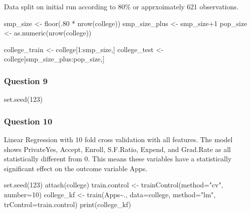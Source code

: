 \documentclass[]{article}
\newenvironment{Shaded}{\begin{snugshade}}{\end{snugshade}}
\newcommand{\AttributeTok}[1]{\textcolor[rgb]{0.77,0.63,0.00}{#1}}
\newcommand{\DecValTok}[1]{\textcolor[rgb]{0.00,0.00,0.81}{#1}}
\newcommand{\FunctionTok}[1]{\textcolor[rgb]{0.00,0.00,0.00}{#1}}
\newcommand{\NormalTok}[1]{#1}
\newcommand{\OtherTok}[1]{\textcolor[rgb]{0.56,0.35,0.01}{#1}}
\newcommand{\SpecialCharTok}[1]{\textcolor[rgb]{0.00,0.00,0.00}{#1}}
\newcommand{\StringTok}[1]{\textcolor[rgb]{0.31,0.60,0.02}{#1}}
\begin{document}
Data split on initial run according to 80\% or apprxoimately 621
observations.

\begin{Shaded}
\begin{Highlighting}[]
\NormalTok{smp\_size }\OtherTok{\textless{}{-}} \FunctionTok{floor}\NormalTok{(.}\DecValTok{80} \SpecialCharTok{*} \FunctionTok{nrow}\NormalTok{(college))}
\NormalTok{smp\_size\_plus }\OtherTok{\textless{}{-}}\NormalTok{ smp\_size}\SpecialCharTok{+}\DecValTok{1}
\NormalTok{pop\_size }\OtherTok{\textless{}{-}} \FunctionTok{as.numeric}\NormalTok{(}\FunctionTok{nrow}\NormalTok{(college))}

\NormalTok{college\_train }\OtherTok{\textless{}{-}}\NormalTok{ college[}\DecValTok{1}\SpecialCharTok{:}\NormalTok{smp\_size,]}
\NormalTok{college\_test }\OtherTok{\textless{}{-}}\NormalTok{ college[smp\_size\_plus}\SpecialCharTok{:}\NormalTok{pop\_size,]}
\end{Highlighting}
\end{Shaded}

\hypertarget{question-9}{%
\subsubsection{Question 9}\label{question-9}}

\begin{Shaded}
\begin{Highlighting}[]
\FunctionTok{set.seed}\NormalTok{(}\DecValTok{123}\NormalTok{)}
\end{Highlighting}
\end{Shaded}

\hypertarget{question-10}{%
\subsubsection{Question 10}\label{question-10}}

Linear Regression with 10 fold cross validation with all features. The
model shows PrivateYes, Accept, Enroll, S.F.Ratio, Expend, and Grad.Rate
as all statistically different from 0. This means these variables have a
statistically significant effect on the outcome variable Apps.

\begin{Shaded}
\begin{Highlighting}[]
\FunctionTok{set.seed}\NormalTok{(}\DecValTok{123}\NormalTok{)}
\FunctionTok{attach}\NormalTok{(college)}
\NormalTok{train.control }\OtherTok{\textless{}{-}} \FunctionTok{trainControl}\NormalTok{(}\AttributeTok{method=}\StringTok{"cv"}\NormalTok{, }\AttributeTok{number=}\DecValTok{10}\NormalTok{)}
\NormalTok{college\_kf }\OtherTok{\textless{}{-}} \FunctionTok{train}\NormalTok{(Apps}\SpecialCharTok{\textasciitilde{}}\NormalTok{., }
                      \AttributeTok{data=}\NormalTok{college, }
                      \AttributeTok{method=}\StringTok{"lm"}\NormalTok{, }
                      \AttributeTok{trControl=}\NormalTok{train.control)}
\FunctionTok{print}\NormalTok{(college\_kf)}
\end{Highlighting}
\end{Shaded}
\end{document}
